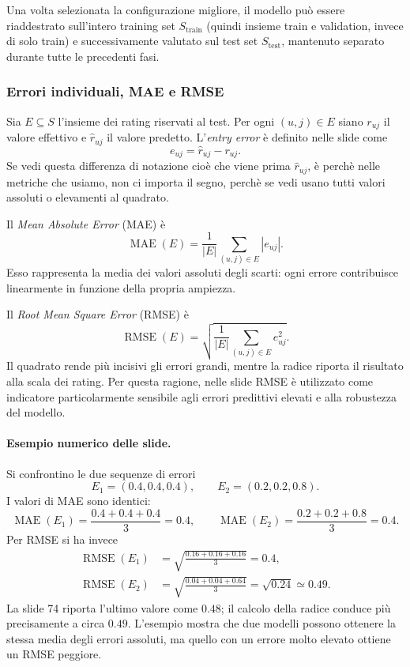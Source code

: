 Una volta selezionata la configurazione migliore,
il modello può essere riaddestrato sull'intero
training set $S_{\text{train}}$ (quindi insieme train e validation, invece di solo train) e successivamente
valutato sul test set $S_{\text{test}}$, mantenuto
separato durante tutte le precedenti fasi.


\subsubsection{Errori individuali, MAE e RMSE}
Sia $E\subseteq S$ l'insieme dei rating riservati al test. Per ogni $(u,j)\in E$ siano $r_{uj}$ il valore effettivo e $\hat r_{uj}$ il valore predetto. L'\emph{entry error} è definito nelle slide come
\[
e_{uj}=\hat r_{uj}-r_{uj}.
\]
Se vedi questa differenza di notazione cioè che viene prima $\hat r_{uj}$, è perchè nelle metriche che usiamo, non ci importa il segno, perchè se vedi usano tutti valori assoluti o elevamenti al quadrato.

Il \emph{Mean Absolute Error} (MAE) è
\[
\operatorname{MAE}(E)=\frac{1}{|E|}\sum_{(u,j)\in E}|e_{uj}|.
\]
Esso rappresenta la media dei valori assoluti degli scarti: ogni errore contribuisce linearmente in funzione della propria ampiezza.

Il \emph{Root Mean Square Error} (RMSE) è
\[
\operatorname{RMSE}(E)=
\sqrt{\frac{1}{|E|}\sum_{(u,j)\in E}e_{uj}^{2}}.
\]
Il quadrato rende più incisivi gli errori grandi, mentre la radice riporta il risultato alla scala dei rating. Per questa ragione, nelle slide RMSE è utilizzato come indicatore particolarmente sensibile agli errori predittivi elevati e alla robustezza del modello.

\paragraph{Esempio numerico delle slide.} Si confrontino le due sequenze di errori
\[
E_1=(0.4,0.4,0.4),\qquad E_2=(0.2,0.2,0.8).
\]
I valori di MAE sono identici:
\[
\operatorname{MAE}(E_1)=\frac{0.4+0.4+0.4}{3}=0.4,
\qquad
\operatorname{MAE}(E_2)=\frac{0.2+0.2+0.8}{3}=0.4.
\]
Per RMSE si ha invece
\begin{align*}
\operatorname{RMSE}(E_1)
&=\sqrt{\frac{0.16+0.16+0.16}{3}}=0.4,\\
\operatorname{RMSE}(E_2)
&=\sqrt{\frac{0.04+0.04+0.64}{3}}
=\sqrt{0.24}\simeq 0.49.
\end{align*}
La slide 74 riporta l'ultimo valore come $0.48$; il calcolo della radice conduce più precisamente a circa $0.49$. L'esempio mostra che due modelli possono ottenere la stessa media degli errori assoluti, ma quello con un errore molto elevato ottiene un RMSE peggiore.


